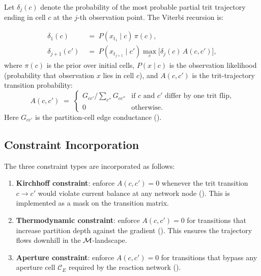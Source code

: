 Let $\delta_j(c)$ denote the probability of the most probable partial trit
trajectory ending in cell $c$ at the $j$-th observation point.  The Viterbi
recursion is:

\begin{align}
    \delta_1(c)
    &\;=\; P(x_{t_1} \mid c)\,\pi(c),
    \label{eq:viterbi-init} \\[4pt]
    \delta_{j+1}(c')
    &\;=\; P(x_{t_{j+1}} \mid c')
    \max_{c}\bigl[\delta_j(c)\,A(c,c')\bigr],
    \label{eq:viterbi-rec}
\end{align}
where $\pi(c)$ is the prior over initial cells, $P(x \mid c)$ is the
observation likelihood (probability that observation $x$ lies in cell $c$),
and $A(c,c')$ is the trit-trajectory transition probability:
\begin{equation}
    A(c,c') \;=\;
    \begin{cases}
        G_{cc'}/\sum_{c''} G_{cc''} & \text{if $c$ and $c'$ differ by one trit flip,}\\
        0 & \text{otherwise.}
    \end{cases}
    \label{eq:transition}
\end{equation}
Here $G_{cc'}$ is the partition-cell edge conductance ().

\subsection{Constraint Incorporation}

The three constraint types are incorporated as follows:

\begin{enumerate}[label=(\alph*), itemsep=4pt]
    \item \textbf{Kirchhoff constraint}: enforce $A(c,c') = 0$ whenever
          the trit transition $c \to c'$ would violate current balance at
          any network node ().  This is implemented as a mask
          on the transition matrix.
    \item \textbf{Thermodynamic constraint}: enforce $A(c,c') = 0$ for
          transitions that increase partition depth against the gradient
          ().  This ensures the trajectory flows downhill in
          the $\mathcal{M}$-landscape.
    \item \textbf{Aperture constraint}: enforce $A(c,c') = 0$ for
          transitions that bypass any aperture cell $\mathcal{C}_E$ required
          by the reaction network ().
\end{enumerate}

